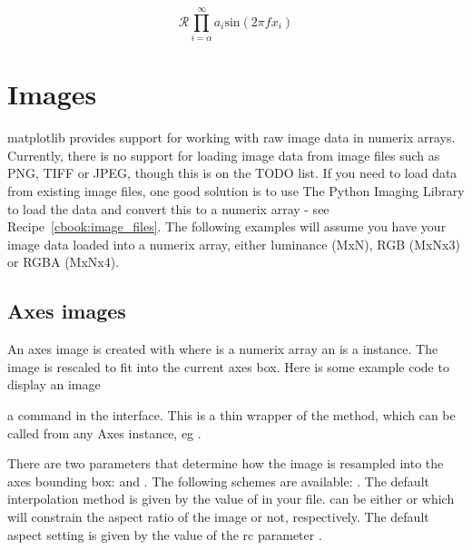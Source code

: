 \documentclass[twoside]{book}
\begin{document}
\begin{equation}
    \mathcal{R}\prod_{i=\alpha}^\infty a_i\mathrm{sin}(2 \pi f x_i)
\end{equation}






\section{Images}
\label{sec:images}

matplotlib provides support for working with raw image data in numerix
arrays.  Currently, there is no support for loading image data from
image files such as PNG, TIFF or JPEG, though this is on the TODO
list.  If you need to load data from existing image files, one good
solution is to use The Python Imaging Library to load the data and
convert this to a numerix array - see Recipe~\ref{cbook:image_files}.
The following examples will assume you have your image data loaded
into a numerix array, either luminance (MxN), RGB (MxNx3) or RGBA
(MxNx4).

\subsection{Axes images}
\label{sec:image_axes}
An axes image is created with  where
 is a numerix array an  is a
 instance.  The image is rescaled to fit
into the current axes box.  Here is some example code to display an
image



\noindent {} a command in the 
interface.  This is a thin wrapper of the
 method, which can be called from any
Axes instance, eg .

There are two parameters that determine how the image is resampled
into the axes bounding box:  and .
The following  schemes are available:
.  The default
interpolation method is given by the value of 
in your  file.   can be either
 or  which will constrain the aspect ratio of
the image or not, respectively.  The default aspect setting is given
by the value of the rc parameter .
\end{document}

